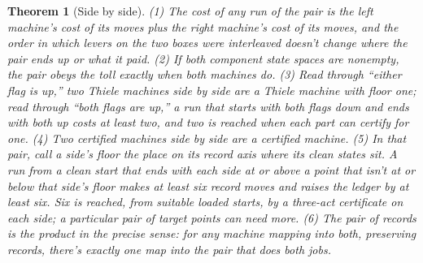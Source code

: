 \documentclass[11pt,twoside]{article}
\theoremstyle{thielethm}
\newtheorem{theorem}{Theorem}[section]
\theoremstyle{thieledef}
\theoremstyle{thieledef}
\theoremstyle{thieledef}
\theoremstyle{thielethm}
\theoremstyle{thieleobs}
\theoremstyle{thielethm}
\begin{document}
\begin{theorem}[Side by side]\label{thm:parts-product}
(1) The cost of any run of the pair is the left machine's cost of its moves plus the right
machine's cost of its moves, and the order in which levers on the two boxes were interleaved doesn't
change where the pair ends up or what it paid. (2) If both component state spaces are nonempty, the pair obeys the toll exactly when both machines
do. (3) Read through ``either flag is up,'' two Thiele machines side by side are a
Thiele machine with floor one; read through ``both flags are up,'' a run that starts with both
flags down and ends with both up costs at least two, and two is reached when each part can certify
for one. (4) Two certified machines side by side
are a certified machine. (5) In that pair, call a side's \emph{floor} the place on its record axis where its clean states sit. A run from
a clean start that ends with each side at or above a point that isn't
at or below that side's floor makes at least six record moves and raises the ledger by at least
six. Six is reached, from suitable loaded starts, by a three-act certificate on each side; a
particular pair of target points can need more. (6) The pair of records is the product in the precise sense: for any machine
mapping into both, preserving records, there's exactly one map into the pair that does both jobs.
\end{theorem}
\end{document}

